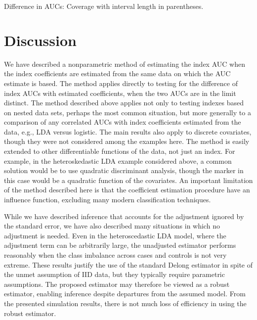 \documentclass[12pt]{article}
\theoremstyle{definition}
\begin{document}
\begin{table}
  \centering
  
  \caption{Difference in AUCs: Coverage with interval length in parentheses.}
  \label{table:auc}
\end{table}



\section{Discussion}
We have described a nonparametric method of estimating the index AUC
when the index coefficients are estimated from the same data on which
the AUC estimate is based. The method applies directly to testing for
the difference of index AUCs with estimated coefficients, when the two
AUCs are in the limit distinct. The method described above applies not
only to testing indexes based on nested data sets, perhaps the most
common situation, but more generally to a comparison of any correlated
AUCs with index coefficients estimated from the data, e.g., LDA versus
logistic. The main results also apply to discrete covariates, though
they were not considered among the examples here. The method is easily
extended to other differentiable functions of the data, not just an
index. For example, in the heteroskedastic LDA example considered
above, a common solution would be to use quadratic discriminant
analysis, though the marker in this case would be a quadratic function
of the covariates. An important limitation of the method described
here is that the coefficient estimation procedure have an influence
function, excluding many modern classification techniques.

While we have described inference that accounts for the adjustment
ignored by the standard error, we have also described many situations
in which no adjustment is needed. Even in the heteroscedastic LDA
model, where the adjustment term can be arbitrarily large, the
unadjusted estimator performs reasonably when the class imbalance
across cases and controls is not very extreme. These results justify
the use of the standard Delong estimator in spite of the unmet
assumption of IID data, but they typically require parametric
assumptions. The proposed estimator may therefore be viewed as a
robust estimator, enabling inference despite departures from the
assumed model. From the presented simulation results, there is not
much loss of efficiency in using the robust estimator.



\end{document}
